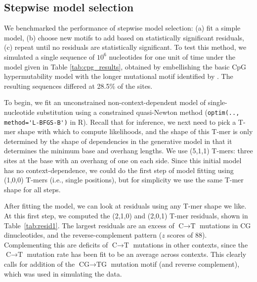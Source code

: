 \documentclass{article}
\newcommand{\nA}{\mbox{A}}  %
\newcommand{\nC}{\mbox{C}}
\newcommand{\nG}{\mbox{G}}
\newcommand{\nT}{\mbox{T}}
\theoremstyle{plain}
\theoremstyle{definition}
\begin{document}
\subsection{Stepwise model selection}

We benchmarked the performance of stepwise model selection:
(a) fit a simple model,
(b) choose new motifs to add based on statistically significant residuals,
(c) repeat until no residuals are statistically significant.
To test this method,
we simulated a single sequence of $10^6$ nucleotides
for one unit of time
under the model given in Table \ref{tab:cpg_results},
obtained by embellishing the basic CpG hypermutability model
with the longer mutational motif identified by \citet{harris2015evidence}.
The resulting sequences differed at 28.5\% of the sites.

To begin, we fit an unconstrained non-context-dependent
model of single-nucleotide substitution
using a constrained quasi-Newton method (\verb|optim(.., method='L-BFGS-B')| in R).
Recall that for inference, we next need to pick a T-mer shape
with which to compute likelihoods,
and the shape of this T-mer is only determined by the shape of dependencies in the generative model
in that it determines the minimum base and overhang lengths.
We use (5,1,1) T-mers: three sites at the base with an overhang of one on each side.
Since this initial model has no context-dependence,
we could do the first step of model fitting using (1,0,0) T-mers (i.e., single positions),
but for simplicity we use the same T-mer shape for all steps.

After fitting the model, we can look at residuals using any T-mer shape we like.
At this first step, we computed the (2,1,0) and (2,0,1) T-mer residuals,
shown in Table~\ref{tab:resid1}.
The largest residuals are an excess of $\nC \to \nT$ mutations in $\nC\nG$ dinucleotides,
and the reverse-complement pattern ($z$ scores of 88).
Complementing this are deficits of $\nC \to \nT$ mutations in other contexts,
since the $\nC \to \nT$ mutation rate has been fit to be an average across contexts.
This clearly calls for addition of the $\nC\nG \to \nT\nG$ mutation motif (and reverse complement),
which was used in simulating the data.
\end{document}
